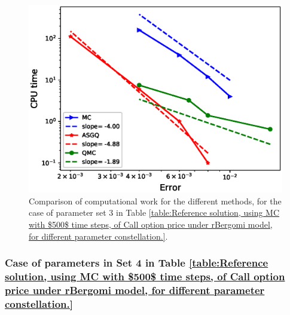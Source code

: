 \FloatBarrier

\begin{figure}[h!]
	\centering
	\includegraphics[width=0.4\linewidth]{./figures/rBergomi_Complexity_rates/set6/error_vs_time_set6_full_comparison}
	
	\caption{Comparison of computational work for the different  methods, for the case of parameter set $3$ in Table \ref{table:Reference solution, using MC with $500$ time steps, of Call option price under rBergomi model, for different parameter constellation.}.}
	\label{fig:Complexity plot for MC and MISC for case set $4$ parameters}
\end{figure}
\FloatBarrier

\subsubsection{Case of parameters in Set 4  in Table \ref{table:Reference solution, using MC with $500$ time steps, of Call option price under rBergomi model, for different parameter constellation.} }\label{sec:Case of set 5 parameters}

